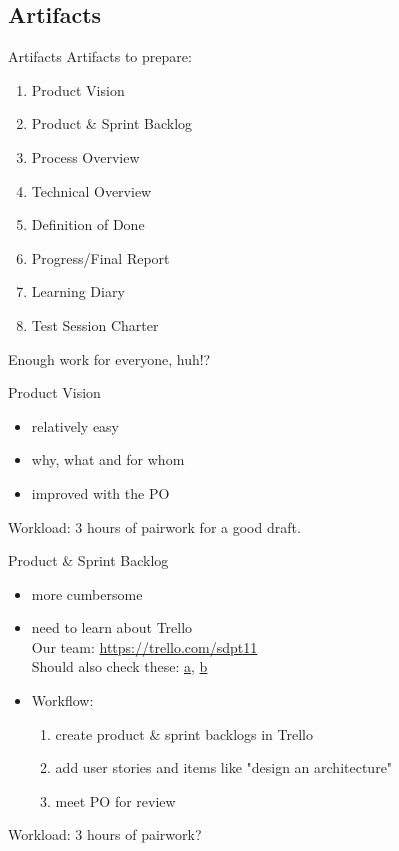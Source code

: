 \documentclass{beamer}
\newcommand{\bgset}[1]{\usebackgroundtemplate{
  \texttt{[image: \#1]}}}
\begin{document}
\subsection{Artifacts}
\begin{frame}{Artifacts}
  Artifacts to prepare:
  \begin{enumerate}
  \pause \item Product Vision
  \pause \item Product \& Sprint Backlog
  \pause \item Process Overview
  \pause \item Technical Overview
  \pause \item Definition of Done
  \pause \item Progress/Final Report
  \pause \item Learning Diary
  \pause \item Test Session Charter
  \end{enumerate}
  \pause \alert{Enough work} \pause for \alert{everyone}, huh!?
\end{frame}
\bgset{../gfx/neural1__bgmod.jpg}
\begin{frame}{Product Vision}
  \begin{itemize}
  \item relatively easy
  \item why, what and for whom
  \item improved with the PO
  \end{itemize}
  Workload: 3 hours of pairwork for a good draft.
\end{frame}
\begin{frame}{Product \& Sprint Backlog}
  \begin{itemize}
  \item more cumbersome
  \item need to learn about Trello \\
    Our team: \url{https://trello.com/sdpt11} \\
    Should also check these:
    \href{http://scrumfortrello.com/}{a},
    \href{http://www.tommasonervegna.com/blog/2014/1/9/10-effective-tips-for-using-trello-as-an-agile-scrum-project-management-tool}{b}
  \item Workflow:
    \begin{enumerate}
    \item create product \& sprint backlogs in Trello
    \item add user stories and items like "design an architecture"
    \item meet PO for review
    \end{enumerate}
  \end{itemize}
  Workload: 3 hours of pairwork?
\end{frame}
\end{document}
